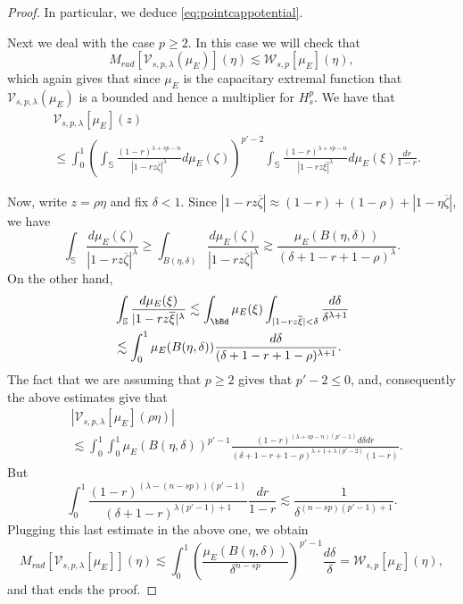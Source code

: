 \documentclass[12pt,twoside,leqno,final]{amsart}
\theoremstyle{plain}
\begin{document}
\begin{proof}
In particular, we deduce  \eqref{eq:pointcappotential}.

Next we deal with the case $p\geq 2$. In this case we will check that
\begin{equation}\label{eq:pointcappotential2}M_{rad}[{\mathcal V}_{s,p,\lambda}(\mu_E)](\eta)\lesssim 
{\mathcal W}_{s,p}[\mu_E](\eta),\end{equation}
which again gives that since $\mu_E$ is the capacitary extremal function that ${\mathcal V}_{s,p,\lambda}(\mu_E)$ is a bounded and hence a multiplier for $H_s^p$.
We have that
\begin{equation*}\begin{split}&{\mathcal V}_{s,p,\lambda}[\mu_E](z)\\&\leq \int_0^1 \left(\int_{{\mathbb S}} \frac{(1-r)^{\lambda+sp-n}}{|1-rz\overline{\zeta}|^\lambda}d\mu_E(\zeta)\right)^{p'-2}\int_{{\mathbb S}} \frac{(1-r)^{\lambda+sp-n}}{|1-rz\overline{\xi}|^\lambda}d\mu_E(\xi)\frac{dr}{1-r}.\end{split}\end{equation*}

Now, write $z=\rho\eta$ and fix $\delta<1$. Since $|1-rz\overline{\zeta}|\approx (1-r) +(1-\rho) + |1-\eta\overline{\zeta}|$, we have
$$
\int_{{\mathbb S}} \frac{d\mu_E(\zeta)}{|1-rz\overline{\zeta}|^\lambda}\geq \int_{B(\eta,\delta)} \frac{d\mu_E(\zeta)}{|1-rz\overline{\zeta}|^\lambda}\gtrsim \frac{\mu_E(B(\eta,\delta))}{(\delta+1-r+1-\rho)^\lambda}.$$
On the other hand,
\begin{equation*}\begin{split}&
\int_{{\mathbb S}} \frac{d\mu_E(\xi)}{|1-rz\overline{\xi}|^\lambda}
\lesssim\int_\bBd\mu_E(\xi)\int_{|1-rz\overline{\xi}|<\delta} \frac{d\delta}{\delta^{\lambda+1}} \\
&\lesssim  \int_0^1\mu_E(B(\eta,\delta))\frac{d\delta}{(\delta+1-r+1-\rho)^{\lambda+1}}.
\end{split}\end{equation*}
The fact that we are assuming that $p\geq 2$ gives that $p'-2\leq 0$, and, consequently the above estimates give that
\begin{equation*}\begin{split}&
|{\mathcal V}_{s,p,\lambda}[\mu_E](\rho\eta)|\\&\lesssim\int_0^1  \int_0^1 \mu_E(B(\eta,\delta))^{p'-1}\frac{ (1-r)^{(\lambda+sp-n)(p'-1)}d\delta dr}{(\delta+1-r+1-\rho)^{\lambda+1+\lambda(p'-2)}(1-r)} .
\end{split}\end{equation*}
But
$$
\int_0^1 \frac{(1-r)^{(\lambda-(n-sp))(p'-1)}}{(\delta+1-r)^{\lambda(p'-1)+1}}\frac{dr}{1-r} \lesssim
\frac1{\delta^{(n-sp)(p'-1)+1}}.
$$
Plugging this last estimate in the above one, we obtain
$$
M_{rad}[{\mathcal V}_{s,p,\lambda}[\mu_E]](\eta)\lesssim \int_0^1 \left( \frac{\mu_E(B(\eta,\delta))}{\delta^{n-sp}}\right)^{p'-1} \frac{d\delta}{\delta}={\mathcal W}_{s,p}[\mu_E](\eta),$$
and that ends the proof.
\end{proof}
\end{document}
